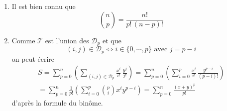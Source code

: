 \begin{enumerate}
 \item Il est bien connu que 
\begin{displaymath}
 \binom{n}{p} = \frac{n!}{p! \, (n-p)!}
\end{displaymath}
\item Comme $\mathcal T$ est l'union des $\mathcal{D}_p$ et que
\begin{displaymath}
 (i,j)\in \mathcal{D}_p\Leftrightarrow i\in\{0,\cdots,p\} \text{ avec } j = p-i
\end{displaymath}
on peut écrire
\begin{multline*}
 S = \sum_{p=0}^{n}\left( \sum_{(i,j)\in\mathcal D _p}\frac{x^i}{i!}\,\frac{y^j}{j!}\right)
= \sum_{p=0}^{n}\left( \sum_{i=0}^{p}\frac{x^i}{i!}\,\frac{y^{p-i}}{(p-i)!}\right)  \\
= \sum_{p=0}^{n}\frac{1}{p!}\left( \sum_{i=0}^{p} \binom{p}{i}x^i y^{p-i}\right)
= \sum_{p=0}^{n}\frac{(x+y)^p}{p!}
\end{multline*}
d'après la formule du binôme.
\end{enumerate}
